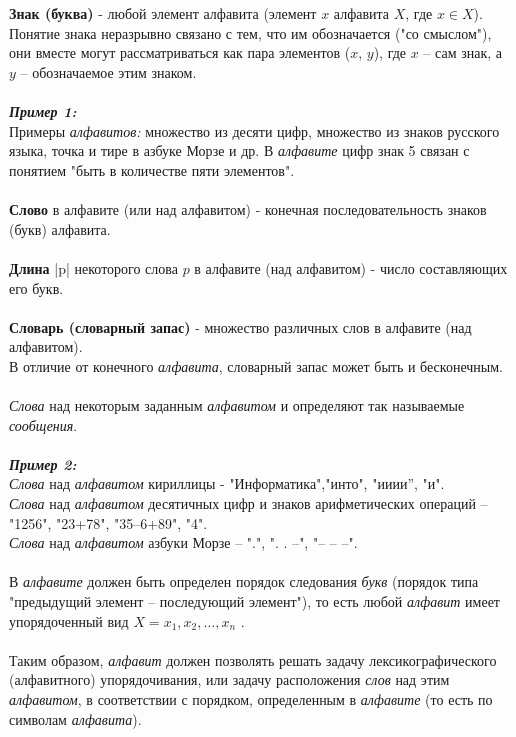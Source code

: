 \\
\\\textbf{Знак (буква)} - любой элемент алфавита (элемент $x$ алфавита $X$, где $x \in X$). Понятие знака неразрывно связано с тем, что им обозначается ("со смыслом"), они вместе могут рассматриваться как пара элементов ($x$, $y$), где $x$ – сам знак, а $y$ – обозначаемое этим знаком.\\
\\\emph{\textbf{Пример 1:}}
\\Примеры \emph{алфавитов:} множество из десяти цифр, множество из знаков русского языка, точка и тире в азбуке Морзе и др. В \emph{алфавите} цифр знак 5 связан с понятием "быть в количестве пяти элементов".\\
\\\textbf{Слово} в алфавите (или над алфавитом) - конечная последовательность знаков (букв) алфавита.
\\
\\\textbf{Длина} |p| некоторого слова $p$ в алфавите (над алфавитом) - число составляющих его букв.
\\
\\\textbf{Словарь (словарный запас)} - множество различных слов в алфавите (над алфавитом).
\\В отличие от конечного \emph{алфавита}, словарный запас может быть и бесконечным.\\
\\\emph{Слова} над некоторым заданным \emph{алфавитом} и определяют так называемые \emph{сообщения}.\\
\\\emph{\textbf{Пример 2:}}
\\\emph{Слова} над \emph{алфавитом} кириллицы - "Информатика","инто", "ииии'', "и". 
\\\emph{Слова} над \emph{алфавитом} десятичных цифр и знаков арифметических операций – "1256", "23+78", "35–6+89", "4". 
\\\emph{Слова} над \emph{алфавитом} азбуки Морзе – ".", ". . –", "– – –".\\
\\В  \emph{алфавите} должен быть определен порядок следования \emph{букв} (порядок типа "предыдущий элемент – последующий элемент"), то есть любой \emph{алфавит} имеет упорядоченный вид $X = {x_1, x_2, …, x_n}$ .\\
\\Таким образом, \emph{алфавит} должен позволять решать задачу лексикографического (алфавитного) упорядочивания, или задачу расположения \emph{слов} над этим \emph{алфавитом}, в соответствии с порядком, определенным в \emph{алфавите} (то есть по символам \emph{алфавита}).

